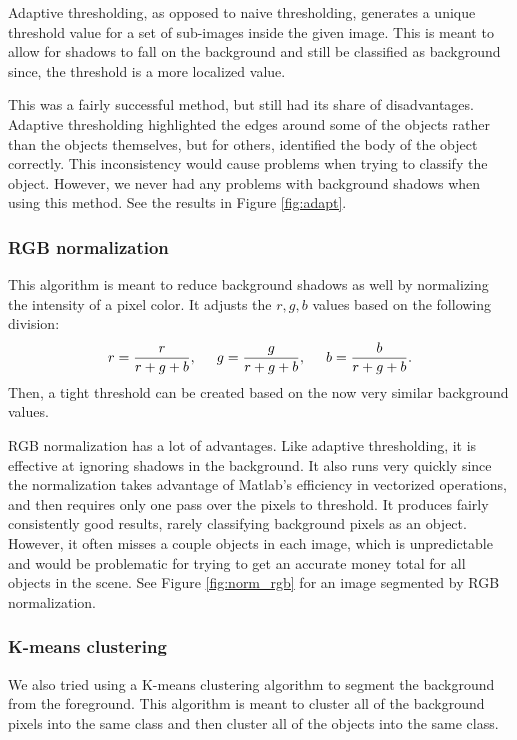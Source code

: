 \documentclass[12pt]{article}
\begin{document}
Adaptive thresholding, as opposed to naive thresholding, generates a unique threshold value for a set of sub-images inside the given image. This is meant to allow for shadows to fall on the background and still be classified as background since, the threshold is a more localized value.

This was a fairly successful method, but still had its share of disadvantages. Adaptive thresholding highlighted the edges around some of the objects rather than the objects themselves, but for others, identified the body of the object correctly. This inconsistency would cause problems when trying to classify the object. However, we never had any problems with background shadows when using this method. See the results in Figure \ref{fig:adapt}.

\subsubsection{RGB normalization}

This algorithm is meant to reduce background shadows as well by normalizing the intensity of a pixel color. It adjusts the $r,g,b$ values based on the following division:
\[r=\frac{r}{r+g+b},\hspace{5mm}g=\frac{g}{r+g+b},\hspace{5mm}b=\frac{b}{r+g+b}.\]
Then, a tight threshold can be created based on the now very similar background values. 

RGB normalization has a lot of advantages. Like adaptive thresholding, it is effective at ignoring shadows in the background. It also runs very quickly since the normalization takes advantage of Matlab's efficiency in vectorized operations, and then requires only one pass over the pixels to threshold. It produces fairly consistently good results, rarely classifying background pixels as an object. However, it often misses a couple objects in each image, which is unpredictable and would be problematic for trying to get an accurate money total for all objects in the scene. See Figure \ref{fig:norm_rgb} for an image segmented by RGB normalization.

\subsubsection{K-means clustering}

We also tried using a K-means clustering algorithm to segment the background from the foreground. This algorithm is meant to cluster all of the background pixels into the same class and then cluster all of the objects into the same class.
\end{document}
